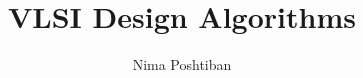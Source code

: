 \documentclass[12pt]{article}
\title{VLSI Design Algorithms}
\author{Nima Poshtiban}
\date{\displaydate{date}}
\begin{document}
\maketitle
\pagebreak
\tableofcontents


\end{document}
